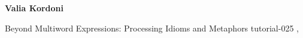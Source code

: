 \begin{bio}
  {\bfseries Valia Kordoni}


\end{bio}

\begin{tutorial}
  {Beyond Multiword Expressions: Processing Idioms and Metaphors}
  {tutorial-025}
  {\daydateyear, \tutorialafternoontime}
  {\TutLocE}


\end{tutorial}
